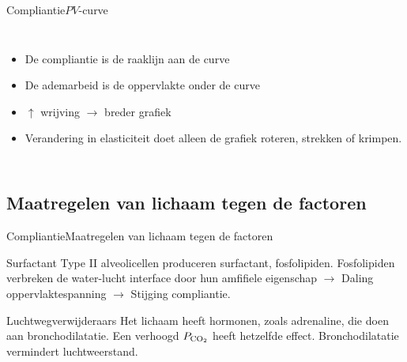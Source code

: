 \documentclass[]{beamer}
\begin{document}
\begin{frame}{Compliantie}{$PV$-curve}
\begin{columns}
{
}
    \begin{itemize}
        \item De compliantie is de raaklijn aan de curve
        \item De ademarbeid is de oppervlakte onder de curve
        \item $\uparrow$ wrijving $\rightarrow$ breder grafiek
        \item Verandering in elasticiteit doet alleen de grafiek roteren, strekken of krimpen.
    \end{itemize}
\end{columns}
\end{frame}
\subsection{Maatregelen van lichaam tegen de factoren}
\begin{frame}{Compliantie}{Maatregelen van lichaam tegen de factoren}
    \begin{block}{Surfactant}
        Type II alveolicellen produceren surfactant, fosfolipiden. Fosfolipiden verbreken de water-lucht interface door hun amfifiele eigenschap $\rightarrow$ Daling oppervlaktespanning $\rightarrow$ Stijging compliantie.
    \end{block}
    \begin{block}{Luchtwegverwijderaars}
        Het lichaam heeft hormonen, zoals adrenaline, die doen aan bronchodilatatie. Een verhoogd $P_\text{CO\textsubscript{2}}$ heeft hetzelfde effect. Bronchodilatatie vermindert luchtweerstand.
    \end{block}
\end{frame}
\end{document}
